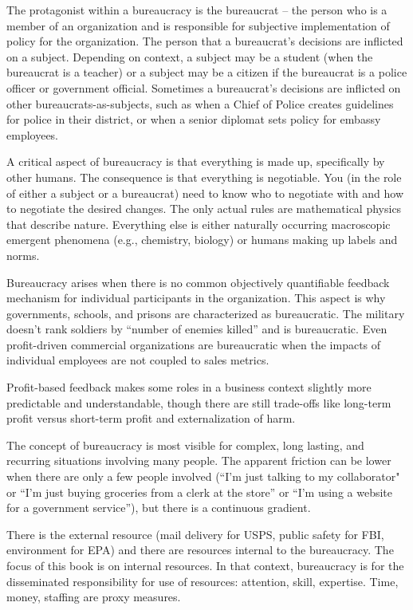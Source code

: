 The protagonist within a \gls{bureaucracy} is the \gls{bureaucrat} -- the person who is a member of an organization and is responsible for subjective implementation of policy for the organization. The person that a bureaucrat's decisions are inflicted on a \gls{subject}.  Depending on context, a subject may be a student (when the bureaucrat is a teacher) or a subject may be a citizen if the bureaucrat is a police officer or government official. Sometimes a bureaucrat's decisions are inflicted on other bureaucrats-as-subjects, such as when a Chief of Police creates guidelines for police in their district, or when a senior diplomat sets policy for embassy employees. 

A critical aspect of bureaucracy is that everything is made up, specifically by other humans. The consequence is that everything is negotiable. You (in the role of either a subject or a bureaucrat) need to know who to negotiate with and how to negotiate the desired changes. The only actual rules are mathematical physics that describe nature. Everything else is either naturally occurring macroscopic emergent phenomena (e.g., chemistry, biology) or humans making up labels and norms. 

Bureaucracy arises when there is no common objectively quantifiable feedback mechanism for individual participants in the organization. This aspect is why governments, schools, and prisons are characterized as bureaucratic. The military doesn't rank soldiers by ``number of enemies killed'' and is bureaucratic. Even profit-driven commercial organizations are bureaucratic when the impacts of individual employees are not coupled to sales metrics. 

Profit-based feedback makes some roles in a business context slightly more predictable and understandable, though there are still trade-offs like long-term profit versus short-term profit and externalization of harm. 

The concept of bureaucracy is most visible for complex, long lasting, and recurring situations involving many people. The apparent friction can be lower when there are only a few people involved (``I'm just talking to my collaborator" or ``I'm just buying groceries from a clerk at the store'' or ``I'm using a website for a government service''), but there is a continuous gradient. 

There is the external resource (mail delivery for USPS, public safety for FBI, environment for EPA) and there are resources internal to the bureaucracy. The focus of this book is on internal resources. In that context, bureaucracy is for the disseminated responsibility for use of resources: attention, skill, expertise. Time, money, staffing are proxy measures.



